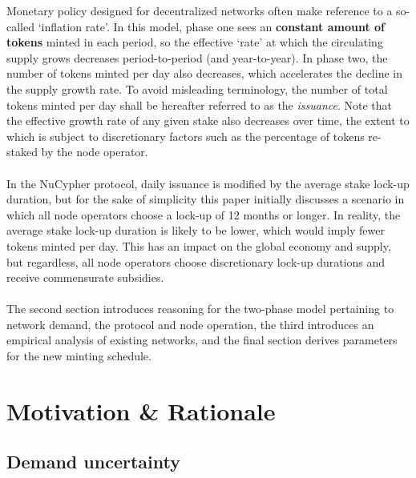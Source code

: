 \documentclass[8pt]{article}
\begin{document}
Monetary policy designed for decentralized networks often make reference to a so-called `inflation rate'. In this model, phase one sees an \textbf{constant amount of tokens} minted in each period, so the effective `rate' at which the circulating supply grows decreases period-to-period (and year-to-year). In phase two, the number of tokens minted per day also decreases, which accelerates the decline in the supply growth rate. To avoid misleading terminology, the number of total tokens minted per day shall be hereafter referred to as the \textit{issuance}. Note that the effective growth rate of any given stake also decreases over time, the extent to which is subject to discretionary factors such as the percentage of tokens re-staked by the node operator. 
\\\\
In the NuCypher protocol, daily issuance is modified by the average stake lock-up duration, but for the sake of simplicity this paper initially discusses a scenario in which all node operators choose a lock-up of 12 months or longer. In reality, the average stake lock-up duration is likely to be lower, which would imply fewer tokens minted per day. This has an impact on the global economy and supply, but regardless, all node operators choose discretionary lock-up durations and receive commensurate subsidies.
\\\\
The second section introduces reasoning for the two-phase model pertaining to network demand, the protocol and node operation, the third introduces an empirical analysis of existing networks, and the final section derives parameters for the new minting schedule.

\section{Motivation \& Rationale}

\subsection{Demand uncertainty}
\end{document}
